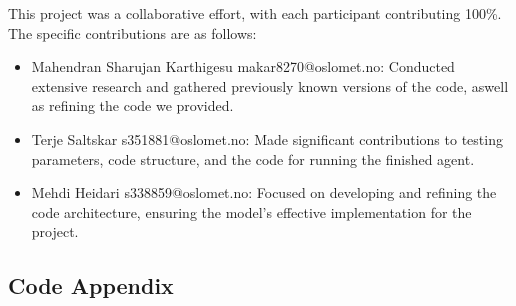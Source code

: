 \documentclass[conference]{IEEEtran}
\begin{document}
This project was a collaborative effort, with each participant contributing 100\%. The specific contributions are as follows:
\begin{itemize}
\item Mahendran Sharujan Karthigesu
makar8270@oslomet.no:  Conducted extensive research and gathered previously known versions of the code, aswell as refining the code we provided.

\item Terje Saltskar
s351881@oslomet.no: Made significant contributions to testing parameters, code structure, and the code for running the finished agent.

\item Mehdi Heidari
s338859@oslomet.no: Focused on developing and refining the code architecture, ensuring the model's effective implementation for the project. 
\end{itemize}

\subsection{Code Appendix}
\end{document}
